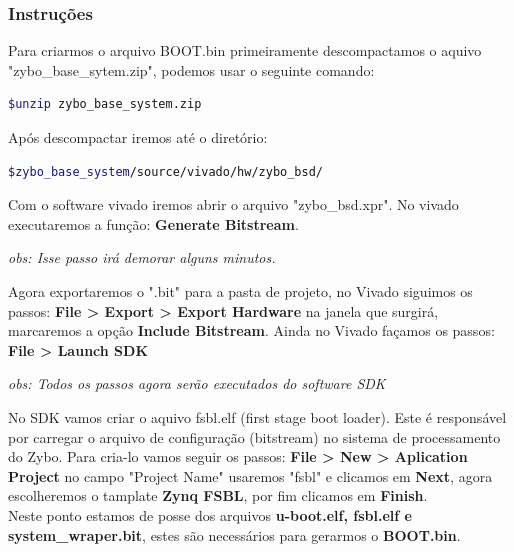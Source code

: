 \begin{anexosenv}
\begin{itemize}
\end{itemize}



\subsubsection{Instruções}
Para criarmos o arquivo BOOT.bin  primeiramente descompactamos o aquivo "zybo\_base\_sytem.zip", podemos usar o seguinte comando:

\begin{lstlisting}[language=bash]
$unzip zybo_base_system.zip
\end{lstlisting}

Após descompactar iremos até o diretório:

\begin{lstlisting}[language=bash]
$zybo_base_system/source/vivado/hw/zybo_bsd/
\end{lstlisting}

Com o software vivado iremos abrir o arquivo "zybo\_bsd.xpr".
No vivado executaremos a função: \textbf{Generate Bitstream}.
 
\textit{obs: Isse passo irá demorar alguns minutos.}

Agora exportaremos o ".bit" para a pasta de projeto, no Vivado siguimos os passos: \textbf{File > Export > Export Hardware} na janela que surgirá, marcaremos a opção \textbf{Include Bitstream}.
Ainda no Vivado façamos os passos: \textbf{File > Launch SDK}

\textit{obs: Todos os passos agora serão executados do software SDK}

No SDK vamos criar o aquivo fsbl.elf (first stage boot loader). Este é responsável por carregar o arquivo de configuração (bitstream) no sistema de processamento do Zybo. Para cria-lo vamos seguir os passos: \textbf{File > New > Aplication Project} no campo "Project Name" usaremos "fsbl" e clicamos em \textbf{Next}, agora escolheremos o tamplate \textbf{Zynq FSBL}, por fim clicamos em \textbf{Finish}.\\

Neste ponto estamos de posse dos arquivos \textbf{u-boot.elf, fsbl.elf e system\_wraper.bit}, estes são necessários para gerarmos o \textbf{BOOT.bin}.


\end{anexosenv}
